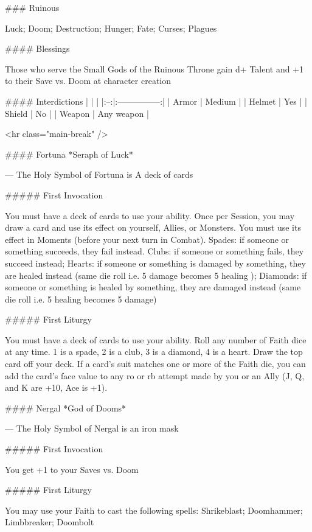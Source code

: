 ### Ruinous



Luck; Doom; Destruction; Hunger; Fate; Curses; Plagues



#### Blessings

Those who serve the Small Gods of the Ruinous Throne gain {d+} Talent and +1 to their Save vs. Doom at character creation

#### Interdictions
| | |
|:--:|:---------------:|
| Armor | Medium |
| Helmet | Yes |
| Shield | No |
| Weapon | Any weapon |

<hr class="main-break" />




#### Fortuna
*Seraph of Luck*

---
The Holy Symbol of Fortuna is A deck of cards

##### First Invocation

You must have a deck of cards to use your ability.  Once per Session, you may draw a card and use its effect on yourself, Allies, or Monsters. You must use its effect in Moments (before your next turn in Combat). Spades: if someone or something succeeds, they fail instead. Clubs: if someone or something fails, they succeed instead; Hearts: if someone or something is damaged by something, they are healed instead (same die roll i.e. 5 damage becomes 5 healing ); Diamonds: if someone or something is healed by something, they are damaged instead (same die roll i.e. 5 healing becomes 5 damage)

##### First Liturgy

You must have a deck of cards to use your ability.  Roll any number of Faith dice at any time.  1 is a spade, 2 is a club, 3 is a diamond, 4 is a heart.  Draw the top card off your deck.  If a card's suit matches one or more of the Faith die, you can add the card's face value to any {ro} or {rb} attempt made by you or an Ally (J, Q, and K are +10, Ace is +1).




#### Nergal
*God of Dooms*

---
The Holy Symbol of Nergal is an iron mask

##### First Invocation

You get +1 to your Saves vs. Doom

##### First Liturgy

You may use your Faith to cast the following spells: Shrikeblast; Doomhammer; Limbbreaker; Doombolt




